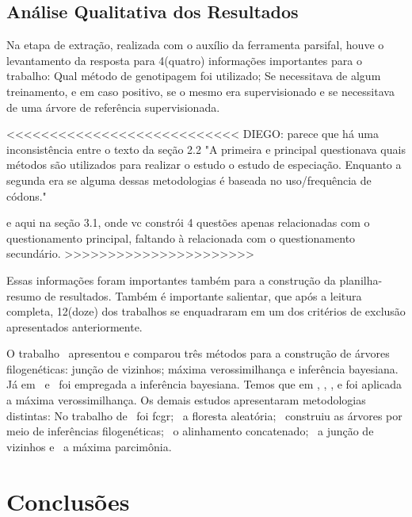 \documentclass[12pt]{article}
\begin{document}
\subsection{Análise Qualitativa dos Resultados}

Na etapa de extração, realizada com o auxílio da ferramenta \gls{parsifal}, houve o levantamento da resposta para 4(quatro) informações importantes para o trabalho: Qual método de genotipagem foi utilizado; Se necessitava de algum treinamento, e em caso positivo, se o mesmo era supervisionado e se necessitava de uma árvore de referência supervisionada. 

<<<<<<<<<<<<<<<<<<<<<<<<<<<
DIEGO: parece que há uma inconsistência entre o texto da seção 2.2 "A primeira e principal questionava quais
métodos são utilizados para realizar o estudo o estudo de especiação. Enquanto a segunda era se alguma dessas metodologias é baseada no uso/frequência de códons."

e aqui na seção 3.1, onde  vc constrói 4 questões apenas relacionadas com o questionamento principal, faltando à relacionada com o questionamento secundário.
>>>>>>>>>>>>>>>>>>>>>>

Essas informações foram importantes também para a construção da planilha-resumo de resultados. Também é importante salientar, que após a leitura completa, 12(doze) dos trabalhos se enquadraram em um dos critérios de exclusão apresentados anteriormente.

O trabalho~\cite{dimitrov_updated_2019} apresentou e comparou três métodos para a construção de árvores filogenéticas: junção de vizinhos; máxima verossimilhança e inferência bayesiana.
Já em~\cite{yin_systematic_2019} e~\cite{bedoya-pilozo_molecular_epidemiology_2018} foi empregada a inferência bayesiana. Temos que em \cite{fall_genetic_diversity_2021}, \cite{behl_threat_2022}, \cite{shabbir_comprehensive_2020}, \cite{hudu_hepatitis_2018} e \cite{cho_analysis_2022} foi aplicada a máxima verossimilhança.
Os demais estudos apresentaram metodologias distintas: No trabalho de~\cite{lichtblau_alignment-free_2019} foi \gls{fcgr};~\cite{kim_ngs_2022} a floresta aleatória;~\cite{sallard_tracing_2021} construiu as árvores por meio de inferências filogenéticas;~\cite{paez-espino_diversity_evolution_2019} o alinhamento concatenado;~\cite{potdar_phylogenetic_2021} a junção de vizinhos e~\cite{tang_evolutionary_2021} a máxima parcimônia.

\section{Conclusões}
\end{document}
